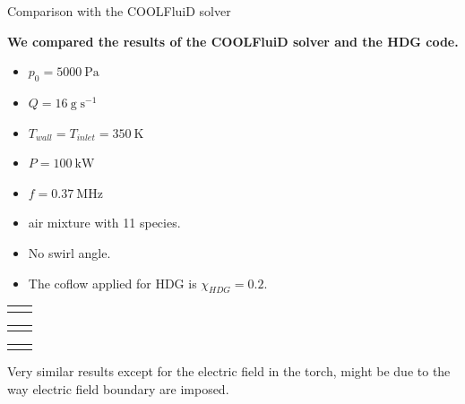 \documentclass[24pt,t,table, aspectratio=169]{beamer}
\begin{document}
\begin{frame}{Comparison with the COOLFluiD solver}

\begin{framed}
\textbf{We compared the results of the COOLFluiD solver and the HDG code.}
\end{framed}
{
\begin{itemize}
	\item $p_0 = \SI{5000}{\pascal}$ 
	\item $Q = \SI{16}{\gram\;\second^{-1}}$ 
	\item $T_{wall} = T_{inlet} = \SI{350}{\kelvin}$
	\item $P = \SI{100}{\kilo\watt}$ 
	\item $f = \SI{0.37}{\mega\hertz}$
	\item air mixture with 11 species.
	\item No swirl angle.
	\item The coflow applied for HDG is $\chi_{HDG} = 0.2$.
\end{itemize}
}

{

\begin{center}
\begin{tabular}{cc}
 &

\end{tabular}
\end{center}

}

{
\begin{tabular}{cc}
 & 
\end{tabular}
}

{
\begin{tabular}{cc}
 & 
\end{tabular}
}

{
Very similar results except for the electric field in the torch, might be due to the way electric field boundary are imposed.
}

\end{frame}
\end{document}
